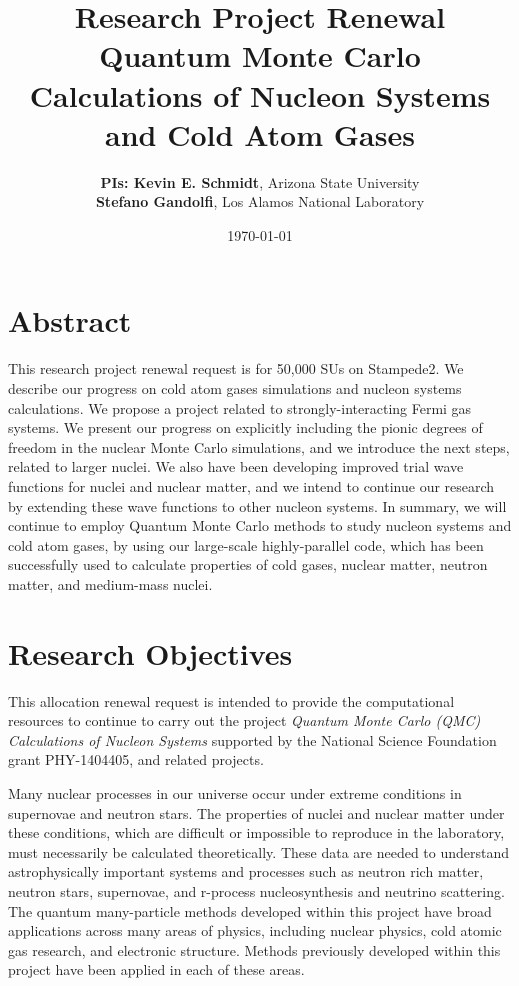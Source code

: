 \documentclass[12pt,letterpaper]{article}
\newcommand{\project}{\large Research Project Renewal  \vskip 0.1cm}
\begin{document}
\onehalfspacing
\title{\project {\Large \textbf{Quantum Monte Carlo Calculations of Nucleon 
Systems and Cold Atom Gases}} \vspace{0cm}}
\author{
{\bf PIs: Kevin E. Schmidt}, Arizona State University \\
{\bf Stefano Gandolfi}, Los Alamos National Laboratory
}
\date{\today}
\maketitle

\vspace*{-2.0cm}

\section*{Abstract}

This research project renewal request is for 50,000 SUs on Stampede2.
We describe our progress on cold atom gases simulations and nucleon systems 
calculations.
We propose a project related to strongly-interacting Fermi gas systems.
We present our progress on explicitly including the pionic degrees of 
freedom in 
the nuclear Monte Carlo simulations, and we introduce the next steps,
related to larger nuclei.
We also have been developing improved trial wave functions for nuclei and 
nuclear matter, and we intend to continue our research by extending these wave 
functions to other nucleon systems.
In summary, we will continue to employ
Quantum Monte Carlo methods to study nucleon systems and cold atom gases, by 
using  
our large-scale highly-parallel code, which 
has been successfully used to calculate properties of cold gases, nuclear 
matter, 
neutron matter, and medium-mass nuclei.

\section{Research Objectives}

This allocation renewal request is intended to provide the computational 
resources 
to continue to carry out the project \textit{Quantum Monte Carlo (QMC) 
Calculations of 
Nucleon Systems} supported by the National Science Foundation grant 
PHY-1404405, and related projects.

Many nuclear processes in our universe occur under extreme conditions in 
supernovae and neutron stars. The properties of nuclei and nuclear matter 
under these conditions, which are difficult or impossible to reproduce in 
the laboratory, must necessarily be calculated theoretically. These data are 
needed to understand astrophysically important systems and processes such as 
neutron rich matter, neutron stars, supernovae, and r-process 
nucleosynthesis and neutrino scattering. The quantum many-particle methods 
developed within this project have broad applications across many areas of 
physics, including nuclear physics, cold atomic gas research, and electronic 
structure. Methods 
previously developed within this project have been applied in each of these 
areas.
\end{document}
